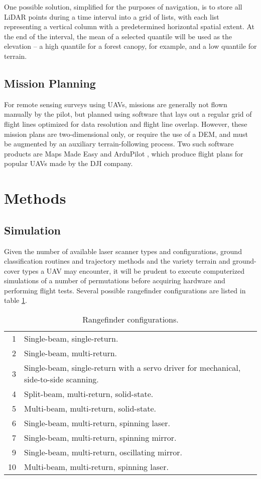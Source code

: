 \documentclass[10pt]{article}
\begin{document}
One possible solution, simplified for the purposes of navigation, is to store all LiDAR points during a time interval into a grid of lists, with each list representing a vertical column with a predetermined horizontal spatial extent. At the end of the interval, the mean of a selected quantile will be used as the elevation -- a high quantile for a forest canopy, for example, and a low quantile for terrain.


\subsection{Mission Planning}

For remote sensing surveys using UAVs, missions are generally not flown manually by the pilot, but planned using software that lays out a regular grid of flight lines optimized for data resolution and flight line overlap. However, these mission plans are two-dimensional only, or require the use of a DEM, and must be augmented by an auxiliary terrain-following process. Two such software products are Maps Made Easy \cite{Tudor2017} and ArduPilot \cite{ArduPilot2017}, which produce flight plans for popular UAVs made by the DJI company.

\section{Methods}

\subsection{Simulation}

Given the number of available laser scanner types and configurations, ground classification routines and trajectory methods and the variety terrain and ground-cover types a UAV may encounter, it will be prudent to execute computerized simulations of a number of permutations before acquiring hardware and performing flight tests. Several possible rangefinder configurations are listed in table \ref{table:rangefinder_configs}. 

\begin{table}
\caption{Rangefinder configurations.}
\label{table:rangefinder_configs}
\begin{tabular}{r | l}
\hline
1 & Single-beam, single-return. \\
2 & Single-beam, multi-return. \\
3 & Single-beam, single-return with a servo driver for mechanical, side-to-side scanning. \\
4 & Split-beam, multi-return, solid-state. \\
5 & Multi-beam, multi-return, solid-state. \\
6 & Single-beam, multi-return, spinning laser. \\
7 & Single-beam, multi-return, spinning mirror. \\
9 & Single-beam, multi-return, oscillating mirror. \\
10 & Multi-beam, multi-return, spinning laser. \\
\hline
\end{tabular}
\end{table}
\end{document}
